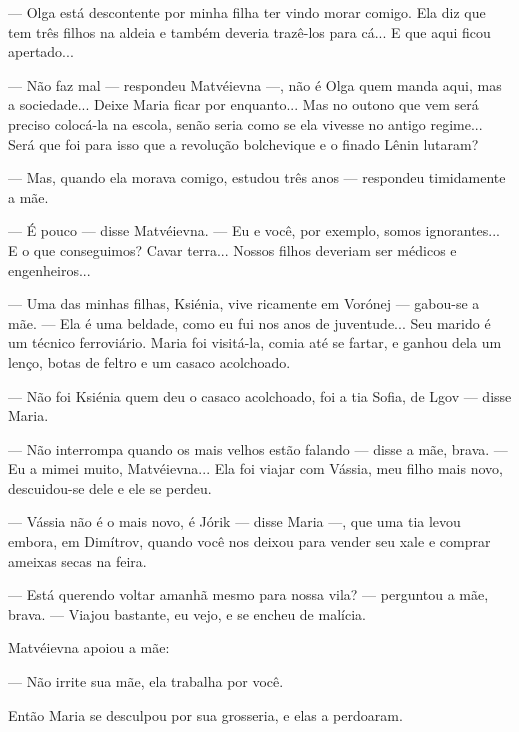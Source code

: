 --- Olga está descontente por minha filha ter vindo morar comigo. Ela
diz que tem três filhos na aldeia e também deveria trazê-los para cá...
E que aqui ficou apertado...

--- Não faz mal --- respondeu Matvéievna ---, não é Olga quem manda
aqui, mas a sociedade... Deixe Maria ficar por enquanto... Mas no outono
que vem será preciso colocá-la na escola, senão seria como se ela
vivesse no antigo regime... Será que foi para isso que a revolução
bolchevique e o finado Lênin lutaram?

--- Mas, quando ela morava comigo, estudou três anos --- respondeu
timidamente a mãe.

--- É pouco --- disse Matvéievna. --- Eu e você, por exemplo, somos
ignorantes... E o que conseguimos? Cavar terra... Nossos filhos deveriam
ser médicos e engenheiros...

--- Uma das minhas filhas, Ksiénia, vive ricamente em Vorónej ---
gabou-se a mãe. --- Ela é uma beldade, como eu fui nos anos de
juventude... Seu marido é um técnico ferroviário. Maria foi visitá-la,
comia até se fartar, e ganhou dela um lenço, botas de feltro e um casaco
acolchoado.

--- Não foi Ksiénia quem deu o casaco acolchoado, foi a tia Sofia, de
Lgov --- disse Maria.

--- Não interrompa quando os mais velhos estão falando --- disse a mãe,
brava. --- Eu a mimei muito, Matvéievna... Ela foi viajar com Vássia,
meu filho mais novo, descuidou-se dele e ele se perdeu.

--- Vássia não é o mais novo, é Jórik --- disse Maria ---, que uma tia
levou embora, em Dimítrov, quando você nos deixou para vender seu xale e
comprar ameixas secas na feira.

--- Está querendo voltar amanhã mesmo para nossa vila? --- perguntou a
mãe, brava. --- Viajou bastante, eu vejo, e se encheu de malícia.

Matvéievna apoiou a mãe:

--- Não irrite sua mãe, ela trabalha por você.

Então Maria se desculpou por sua grosseria, e elas a perdoaram.

